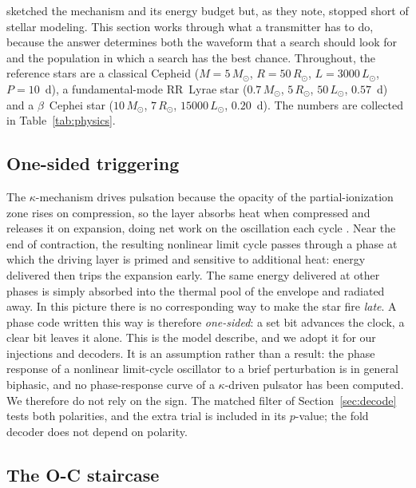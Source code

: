 \documentclass[final,5p]{elsarticle}
\newcommand{\Lsun}{\ensuremath{L_\odot}}
\newcommand{\Msun}{\ensuremath{M_\odot}}
\newcommand{\Rsun}{\ensuremath{R_\odot}}
\newcommand{\bcep}{\ensuremath{\beta}~Cephei}
\begin{document}
\citet{Learned2008} sketched the mechanism and its energy budget but, as they note, stopped short of stellar modeling. This section works through what a transmitter has to do, because the answer determines both the waveform that a search should look for and the population in which a search has the best chance. Throughout, the reference stars are a classical Cepheid ($M=5\,\Msun$, $R=50\,\Rsun$, $L=3000\,\Lsun$, $P=10$~d), a fundamental-mode RR~Lyrae star ($0.7\,\Msun$, $5\,\Rsun$, $50\,\Lsun$, $0.57$~d) and a \bcep{} star ($10\,\Msun$, $7\,\Rsun$, $15000\,\Lsun$, $0.20$~d). The numbers are collected in Table~\ref{tab:physics}.

\subsection{One-sided triggering}
\label{sec:onesided}

The $\kappa$-mechanism drives pulsation because the opacity of the partial-ionization zone rises on compression, so the layer absorbs heat when compressed and releases it on expansion, doing net work on the oscillation each cycle \citep{Buchler1997, Gastine2008}. Near the end of contraction, the resulting nonlinear limit cycle passes through a phase at which the driving layer is primed and sensitive to additional heat: energy delivered then trips the expansion early. The same energy delivered at other phases is simply absorbed into the thermal pool of the envelope and radiated away. In this picture there is no corresponding way to make the star fire \emph{late}. A phase code written this way is therefore \emph{one-sided}: a set bit advances the clock, a clear bit leaves it alone. This is the model \citet{Learned2008} describe, and we adopt it for our injections and decoders. It is an assumption rather than a result: the phase response of a nonlinear limit-cycle oscillator to a brief perturbation is in general biphasic, and no phase-response curve of a $\kappa$-driven pulsator has been computed. We therefore do not rely on the sign. The matched filter of Section~\ref{sec:decode} tests both polarities, and the extra trial is included in its $p$-value; the fold decoder does not depend on polarity.

\subsection{The O-C staircase}
\label{sec:staircase}
\end{document}
